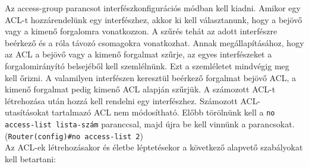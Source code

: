 Az access-group parancsot interfészkonfigurációs módban kell kiadni.
Amikor egy ACL-t hozzárendelünk egy interfészhez, akkor ki kell választanunk, hogy a
bejövő vagy a kimenő forgalomra vonatkozzon. A szűrés tehát az adott interfészre beérkező
és a róla távozó csomagokra vonatkozhat. Annak megállapításához, hogy az ACL a bejövő
vagy a kimenő forgalmat szűrje, az egyes interfészeket a forgalomirányító belsejéből kell
szemlélnünk. Ezt a szemléletet mindvégig meg kell őrizni. A valamilyen interfészen keresztül
beérkező forgalmat bejövő ACL, a kimenő forgalmat pedig kimenő ACL alapján szűrjük.
A számozott ACL-t létrehozása után hozzá kell rendelni egy interfészhez.
Számozott ACL-utasításokat tartalmazó ACL nem módosítható. Előbb törölnünk kell a 
\verb|no access-list lista-szám| paranccsal, majd újra be kell vinnünk a parancsokat.
(\verb|Router(config)#no access-list 2|)\\
Az ACL-ek létrehozásakor és életbe léptetésekor a következő alapvető szabályokat kell
betartani:
